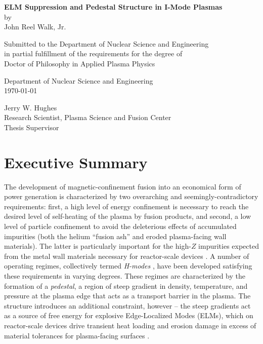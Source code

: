 \documentclass[ twoside,openright,titlepage,numbers=noenddot,headinclude,%
                footinclude=true,cleardoublepage=empty,abstractoff, %
                BCOR=5mm,paper=letter,fontsize=11pt,%
                ngerman,american,%
                ]{scrreprt}
\newcommand{\gnote}[1]{\graffito{\textcolor{red}{#1}}}
\begin{document}
\frenchspacing
\raggedbottom
{}
\pagestyle{plain}

\let\cleardoublepage\relax
\begin{center}{\large{\bf ELM Suppression and Pedestal Structure in I-Mode Plasmas} \\
by \\
John Reel Walk, Jr. \\[\baselineskip]}
\par
Submitted to the Department of Nuclear Science and Engineering \\
in partial fulfillment of the requirements for the degree of \\
Doctor of Philosophy in Applied Plasma Physics
\end{center}
\par
{}\baselineskip
\signature{Author}{Department of Nuclear Science and Engineering \\ \today}
\par
{}\baselineskip
\signature{Certified by}{Jerry W. Hughes \\ Research Scientist, Plasma Science and Fusion Center \\ Thesis Supervisor}
\par
{}\baselineskip

\chapter*{Executive Summary}

The development\gnote{not sure how specific to be with cites} of magnetic-confinement fusion into an economical form of power generation is characterized by two overarching and seemingly-contradictory requirements: first, a high level of energy confinement is necessary to reach the desired level of self-heating of the plasma by fusion products, and second, a low level of particle confinement to avoid the deleterious effects of accumulated impurities (both the helium ``fusion ash'' and eroded plasma-facing wall materials).  The latter is particularly important for the high-$Z$ impurities expected from the metal wall materials necessary for reactor-scale devices \cite{Loarte2007,Joffrin2014}.  A number of operating regimes, collectively termed \emph{H-modes} \cite{Wagner1982}, have been developed satisfying these requirements in varying degrees.  These regimes are characterized by the formation of a \emph{pedestal}, a region of steep gradient in density, temperature, and pressure at the plasma edge that acts as a transport barrier in the plasma.  The structure introduces an additional constraint, however -- the steep gradients act as a source of free energy for explosive Edge-Localized Modes (ELMs), which on reactor-scale devices drive transient heat loading and erosion damage in excess of material tolerances for plasma-facing surfaces \cite{Federici2003}.
\end{document}
